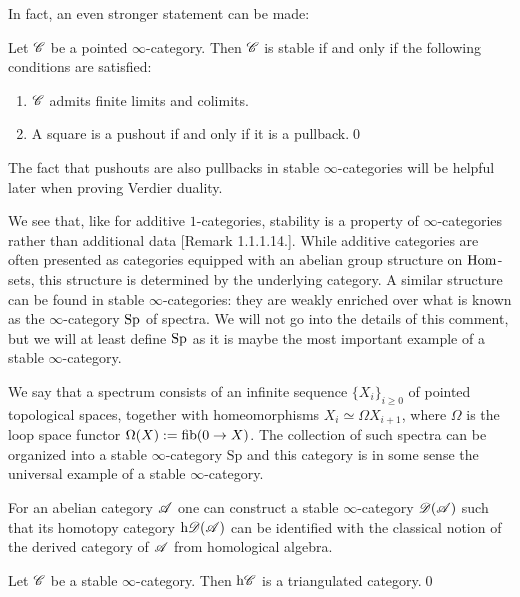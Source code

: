 \documentclass[../../thesis.tex]{subfiles}
\begin{document}
In fact, an even stronger statement can be made:
\begin{proposition}
    Let $\mathscr{C}$ be a pointed $\infty$-category.
    Then $\mathscr{C}$ is stable if and only if the following conditions are satisfied:
    \begin{enumerate}
        \item $\mathscr{C}$ admits finite limits and colimits.
        \item A square is a pushout if and only if it is a pullback.\qed
    \end{enumerate}
\end{proposition}
The fact that pushouts are also pullbacks in stable $\infty$-categories will be helpful later when proving Verdier duality.


We see that, like for additive $1$-categories, stability is a property of $\infty$-categories rather than additional data \cite{HA}[Remark 1.1.1.14.].
While additive categories are often presented as categories equipped with an abelian group structure on $\mathrm{Hom}$-sets, this structure is determined by the underlying category.
A similar structure can be found in stable $\infty$-categories: they are weakly enriched over what is known as the $\infty$-category $\mathrm{Sp}$ of spectra.
We will not go into the details of this comment, but we will at least define $\mathrm{Sp}$ as it is maybe the most important example of a stable $\infty$-category.
\begin{example}[{\cite[Example 1.1.1.11.]{HA}}]
    We say that a spectrum consists of an infinite sequence $\{X_i\}_{i \geq 0}$ of pointed topological spaces, together with homeomorphisms $X_i \simeq \Omega X_{i+1}$, where $\Omega$ is the loop space functor $\Omega(X) : = \operatorname{fib}(0 \to X)$.
    The collection of such spectra can be organized into a stable $\infty$-category $\mathrm{Sp}$ and this category is in some sense the universal example of a stable $\infty$-category.
\end{example}
\begin{example}[{\cite[Example 1.1.1.12.]{HA}}]
    For an abelian category $\mathscr{A}$ one can construct a stable $\infty$-category $\mathscr{D}(\mathscr{A})$ such that its homotopy category $\mathrm{h}\mathscr{D}(\mathscr{A})$ can be identified with the classical notion of the derived category of $\mathscr{A}$ from homological algebra.
\end{example}
\begin{theorem}[{\cite[Theorem 1.1.2.14.]{HA}}]
    Let $\mathscr{C}$ be a stable $\infty$-category.
    Then $\mathrm{h}\mathscr{C}$ is a triangulated category.\qed
\end{theorem}
\end{document}
